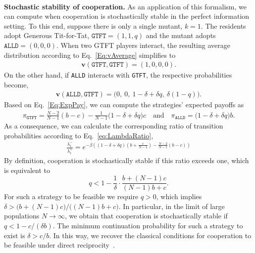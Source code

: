 \documentclass[11pt]{article}
\def\alld{\texttt{ALLD}}
\def\gtft{\texttt{GTFT}}
\theoremstyle{plainCl1}
\theoremstyle{plainCl2}
\begin{document}
~\\
{\bf Stochastic stability of cooperation.}
As an application of this formalism, we can compute when cooperation is stochastically stable in the perfect information setting. 
To this end, suppose there is only a single mutant, $k\!=\!1$. The residents adopt Generous Tit-for-Tat, $\gtft = (1, 1, q)$ and the mutant adopts $\alld\! = \! (0,0,0)$. When two GTFT players interact, the resulting average distribution according to Eq.~\eqref{Eq:vAverage} simplifies to
\begin{align*}
\mathbf{v}(\gtft,\gtft) = (1, 0, 0, 0).
\end{align*}
On the other hand, if \alld{} interacts with \gtft, the respective probabilities become,
\begin{align*}
  \mathbf{v}(\alld,\gtft) = \big(0,~0,~1\!-\!\delta\!+\!\delta q,~\delta(1\! -\! q)\big).
\end{align*}
Based on Eq.~\eqref{Eq:ExpPay}, we can compute the strategies' expected payoffs as
\begin{align*}
\pi_\gtft =  \frac{N\!-\!2}{N-1} (b - c)  \!-\! \frac{1}{N-1}\big(1\!-\!\delta\!+\!\delta q\big)c
\quad \text{and} \quad
\pi_\alld  = \big(1\!-\!\delta\!+\!\delta q\big)b.
\end{align*}
As a consequence, we can calculate the corresponding ratio of transition probabilities according to Eq.~\eqref{eq:LambdaRatio},
\begin{align*}
\frac{\lambda_1^{-}}{\lambda_1^{+}} = e^{-\beta \left( (1-\delta+\delta q)(b+\frac{c}{N-1})- \frac{N-2}{N-1}(b-c) \right)}
\end{align*}
By definition, cooperation is stochastically stable if this ratio exceeds one, which is equivalent to
\begin{equation*}
q<1-\frac{1}{\delta}\cdot \frac{b+(N\!-\!1)c}{(N\!-\!1)b+c}.
\end{equation*}
For such a strategy to be feasible we require $q\!>\!0$, which implies $\delta \!>\! \big(b+(N\!-\!1)c\big)/\big((N\!-\!1)b\!+\!c\big)$.
In particular, in the limit of large populations \(N \!\rightarrow\! \infty\), we obtain that cooperation is stochastically stable if  \(q \!<\! 1\! -\! c/(\delta b)\). 
The minimum continuation probability for such a strategy to exist is $\delta \!>\! c/b$. 
In this way, we recover the classical conditions for cooperation to be feasible under direct reciprocity~\citep{molander:jcr:1985,Nowak1992tit,Schmid:NHB:2021}.



\end{document}
